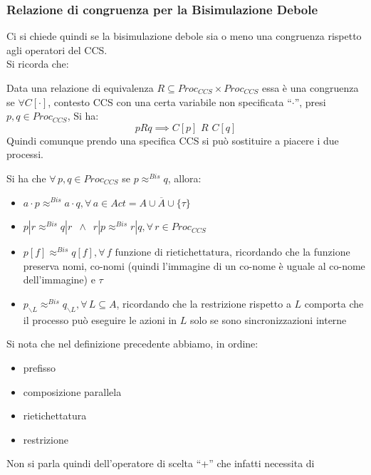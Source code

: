 \subsubsection{Relazione di congruenza per la Bisimulazione Debole}
Ci si chiede quindi se la bisimulazione debole sia o meno una congruenza
rispetto agli operatori del CCS.\\
Si ricorda che:
\begin{definizione}
  Data una relazione di equivalenza $R\subseteq Proc_{CCS}\times Proc_{CCS}$
  essa è una congruenza se $\forall C[\cdot]$, contesto CCS con una certa
  variabile non specificata ``$\cdot$'', presi $p, q\in Proc_{CCS}$, Si ha:
  \[pRq\implies C[p]\,\, R\,\, C[q]\]
  Quindi comunque prendo una specifica CCS si può sostituire a piacere i due
  processi. 
\end{definizione} \vspace{5mm} %
\begin{definizione}
  Si ha che $\forall\, p, q\in Proc_{CCS}$ se $p\approx^{Bis}q$, allora:
  \begin{itemize}
    \item $a\cdot p\approx^{Bis} a\cdot q,\forall\, a\in
    Act=A\cup\overline{A}\cup\{\tau\}$ 
    \item $p|r\approx^{Bis}q|r\,\,\,\land \,\,\,
    r|p\approx^{Bis}r|q,\forall\, r\in Proc_{CCS}$  
    \item $p[f]\approx^{Bis}q[f],\forall\, f\mbox{ funzione di rietichettatura}$,
    ricordando che la funzione preserva nomi, co-nomi (quindi l'immagine di un
    co-nome è uguale al co-nome dell'immagine) e $\tau$
    \item $p_{\backslash L}\approx^{Bis}q_{\backslash L},\forall\, L\subseteq A$,
    ricordando che la restrizione rispetto a $L$ comporta che il processo può
    eseguire le azioni in $L$ solo se sono sincronizzazioni interne
  \end{itemize}
\end{definizione} \vspace{5mm} %
Si nota che nel definizione precedente abbiamo, in ordine:
\begin{itemize}
  \item prefisso
  \item composizione parallela
  \item rietichettatura
  \item restrizione
\end{itemize}
Non si parla quindi dell'operatore di scelta ``+'' che infatti necessita di
